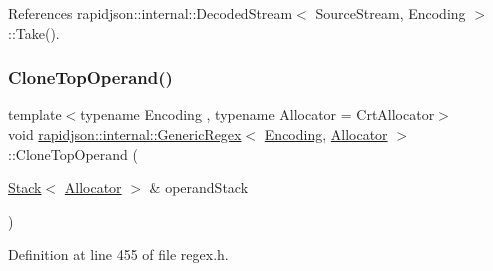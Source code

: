 References rapidjson\+::internal\+::\+Decoded\+Stream$<$ Source\+Stream, Encoding $>$\+::\+Take().

\mbox{\label{classrapidjson_1_1internal_1_1_generic_regex_a2b7289b9bdf26768bb48f38362a75eb3}} 
\subsubsection{\texorpdfstring{CloneTopOperand()}{CloneTopOperand()}}
{\footnotesize\ttfamily template$<$typename Encoding , typename Allocator  = Crt\+Allocator$>$ \\
void \mbox{\hyperlink{classrapidjson_1_1internal_1_1_generic_regex}{rapidjson\+::internal\+::\+Generic\+Regex}}$<$ \mbox{\hyperlink{classrapidjson_1_1_encoding}{Encoding}}, \mbox{\hyperlink{classrapidjson_1_1_allocator}{Allocator}} $>$\+::Clone\+Top\+Operand (\begin{DoxyParamCaption}\item[{\mbox{\hyperlink{classrapidjson_1_1internal_1_1_stack}{Stack}}$<$ \mbox{\hyperlink{classrapidjson_1_1_allocator}{Allocator}} $>$ \&}]{operand\+Stack }\end{DoxyParamCaption})\hspace{0.3cm}{\ttfamily [private]}}



Definition at line 455 of file regex.\+h.


